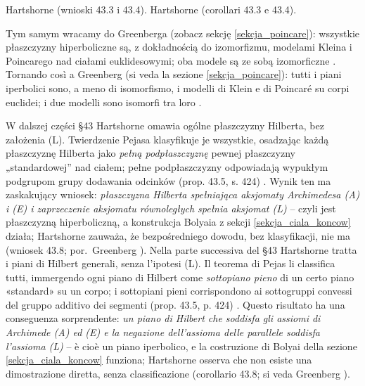 Hartshorne \cite[s. 422]{hartshorne_2000} (wnioski 43.3 i 43.4). %
Hartshorne \cite[p. 422]{hartshorne_2000} (corollari 43.3 e 43.4). %

Tym samym wracamy do Greenberga (zobacz sekcję \ref{sekcja_poincare}): wszystkie płaszczyzny hiperboliczne są, z dokładnością do izomorfizmu, modelami Kleina i Poincarego nad ciałami euklidesowymi; oba modele są ze sobą izomorficzne \cite[s. 209]{greenberg_2010}. %
Tornando così a Greenberg (si veda la sezione \ref{sekcja_poincare}): tutti i piani iperbolici sono, a meno di isomorfismo, i modelli di Klein e di Poincaré su corpi euclidei; i due modelli sono isomorfi tra loro \cite[p. 209]{greenberg_2010}. %

W dalszej części §43 Hartshorne omawia ogólne płaszczyzny Hilberta, bez założenia (L). %
Twierdzenie Pejasa klasyfikuje je wszystkie, osadzając każdą płaszczyznę Hilberta jako \emph{pełną podpłaszczyznę} pewnej płaszczyzny „standardowej'' nad ciałem; pełne podpłaszczyzny odpowiadają wypukłym podgrupom grupy dodawania odcinków (prop. 43.5, s. 424) \cite[s. 424--426]{hartshorne_2000}. %
Wynik ten ma zaskakujący wniosek: \emph{płaszczyzna Hilberta spełniająca aksjomaty Archimedesa (A) i (E) i zaprzeczenie aksjomatu równoległych spełnia aksjomat (L)} -- czyli jest płaszczyzną hiperboliczną, a konstrukcja Bolyaia z sekcji \ref{sekcja_ciala_koncow} działa; Hartshorne zauważa, że bezpośredniego dowodu, bez klasyfikacji, nie ma \cite[s. 426]{hartshorne_2000} (wniosek 43.8; por.~Greenberg \cite[s. 210]{greenberg_2010}). %
Nella parte successiva del §43 Hartshorne tratta i piani di Hilbert generali, senza l'ipotesi (L). %
Il teorema di Pejas li classifica tutti, immergendo ogni piano di Hilbert come \emph{sottopiano pieno} di un certo piano «standard» su un corpo; i sottopiani pieni corrispondono ai sottogruppi convessi del gruppo additivo dei segmenti (prop. 43.5, p. 424) \cite[p. 424--426]{hartshorne_2000}. %
Questo risultato ha una conseguenza sorprendente: \emph{un piano di Hilbert che soddisfa gli assiomi di Archimede (A) ed (E) e la negazione dell'assioma delle parallele soddisfa l'assioma (L)} -- è cioè un piano iperbolico, e la costruzione di Bolyai della sezione \ref{sekcja_ciala_koncow} funziona; Hartshorne osserva che non esiste una dimostrazione diretta, senza classificazione \cite[p. 426]{hartshorne_2000} (corollario 43.8; si veda Greenberg \cite[p. 210]{greenberg_2010}). %
%

